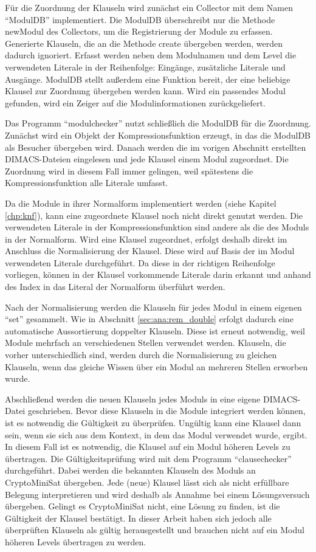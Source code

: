 Für die Zuordnung der Klauseln wird zunächst ein Collector mit dem Namen "`ModulDB"' implementiert. Die ModulDB überschreibt nur die Methode newModul des Collectors,
um die Registrierung der Module zu erfassen. Generierte Klauseln, die an die Methode create übergeben werden, werden dadurch ignoriert. Erfasst werden neben dem
Modulnamen und dem Level die verwendeten Literale in der Reihenfolge: Eingänge, zusätzliche Literale und Ausgänge. ModulDB stellt außerdem eine Funktion bereit,
der eine beliebige Klausel zur Zuordnung übergeben werden kann. Wird ein passendes Modul gefunden, wird ein Zeiger auf die Modulinformationen zurückgeliefert.

Das Programm "`modulchecker"' nutzt schließlich die ModulDB für die Zuordnung. Zunächst wird ein Objekt der Kompressionsfunktion erzeugt, in das die ModulDB als
Besucher übergeben wird. Danach werden die im vorigen Abschnitt erstellten DIMACS-Dateien eingelesen und jede Klausel einem Modul zugeordnet. Die Zuordnung wird
in diesem Fall immer gelingen, weil spätestens die Kompressionsfunktion alle Literale umfasst.

Da die Module in ihrer Normalform implementiert werden (siehe Kapitel \ref{chp:knf}), kann eine zugeordnete Klausel noch nicht direkt genutzt werden.
Die verwendeten Literale in der Kompressionsfunktion sind andere als die des Moduls in der Normalform. Wird eine Klausel zugeordnet, erfolgt deshalb
direkt im Anschluss die Normalisierung der Klausel. Diese wird auf Basis der im Modul verwendeten Literale durchgeführt. Da diese in der richtigen
Reihenfolge vorliegen, können in der Klausel vorkommende Literale darin erkannt und anhand des Index in das Literal der Normalform überführt werden.

Nach der Normalisierung werden die Klauseln für jedes Modul in einem eigenen "`set"' gesammelt. Wie in Abschnitt \ref{sec:ana:rem_double} erfolgt
dadurch eine automatische Aussortierung doppelter Klauseln. Diese ist erneut notwendig, weil Module mehrfach an verschiedenen Stellen verwendet werden.
Klauseln, die vorher unterschiedlich sind, werden durch die Normalisierung zu gleichen Klauseln, wenn das gleiche Wissen über ein Modul an mehreren
Stellen erworben wurde.

Abschließend werden die neuen Klauseln jedes Moduls in eine eigene DIMACS-Datei geschrieben. Bevor diese Klauseln in die Module integriert werden können, ist
es notwendig die Gültigkeit zu überprüfen. Ungültig kann eine Klausel dann sein, wenn sie sich aus dem Kontext, in dem das Modul verwendet wurde, ergibt.
In diesem Fall ist es notwendig, die Klausel auf ein Modul höheren Levels zu übertragen. Die Gültigkeitsprüfung wird mit dem Programm "`clausechecker"'
durchgeführt. Dabei werden die bekannten Klauseln des Moduls an CryptoMiniSat übergeben. Jede (neue) Klausel lässt sich als nicht erfüllbare Belegung
interpretieren und wird deshalb als Annahme bei einem Lösungsversuch übergeben. Gelingt es CryptoMiniSat nicht, eine Lösung zu finden, ist die Gültigkeit
der Klausel bestätigt. In dieser Arbeit haben sich jedoch alle überprüften Klauseln als gültig herausgestellt und brauchen nicht auf ein Modul höheren
Levels übertragen zu werden.

